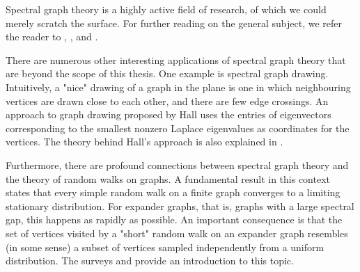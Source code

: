 Spectral graph theory is a highly active field of research, of which we could merely scratch the surface. 
For further reading on the general subject, we refer the reader to \cite{brouwerhaemers}, \cite{spielman}, and \cite{godsilroyle}. 

There are numerous other interesting applications of spectral graph theory that are beyond the scope of this thesis.
One example is spectral graph drawing. 
Intuitively, a "nice" drawing of a graph in the plane is one in which neighbouring vertices are drawn close to each other, and there are few edge crossings.
An approach to graph drawing proposed by Hall \cite{hall} uses the entries of eigenvectors corresponding to the smallest nonzero Laplace eigenvalues as coordinates for the vertices.
The theory behind Hall's approach is also explained in \cite{spielman}.

Furthermore, there are profound connections between spectral graph theory and the theory of random walks on graphs.
A fundamental result in this context states that every simple random walk on a finite graph converges to a limiting stationary distribution. 
For expander graphs, that is, graphs with a large spectral gap, this happens as rapidly as possible.
An important consequence is that the set of vertices visited by a "short" random walk on an expander graph resembles (in some sense) a subset of vertices sampled independently from a uniform distribution.
The surveys \cite{randomwalksongraphs} and \cite[Section 3]{expandergraphs} provide an introduction to this topic.